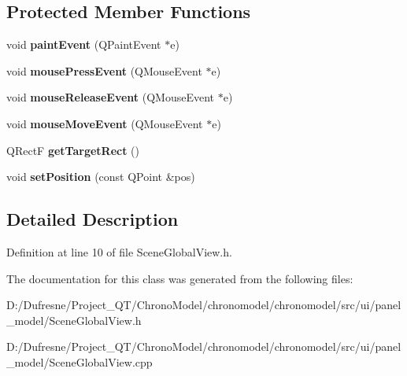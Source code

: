 \subsection*{Protected Member Functions}
\begin{DoxyCompactItemize}
\item 
\hypertarget{class_scene_global_view_ad8dca7d7bc4fbe3737174afe87e99eb5}{void {\bfseries paint\-Event} (Q\-Paint\-Event $\ast$e)}\label{class_scene_global_view_ad8dca7d7bc4fbe3737174afe87e99eb5}

\item 
\hypertarget{class_scene_global_view_acaafabb7a43f832f3e299c7e112d1392}{void {\bfseries mouse\-Press\-Event} (Q\-Mouse\-Event $\ast$e)}\label{class_scene_global_view_acaafabb7a43f832f3e299c7e112d1392}

\item 
\hypertarget{class_scene_global_view_ab20bdc63db23d3e12e7af74cf28ac563}{void {\bfseries mouse\-Release\-Event} (Q\-Mouse\-Event $\ast$e)}\label{class_scene_global_view_ab20bdc63db23d3e12e7af74cf28ac563}

\item 
\hypertarget{class_scene_global_view_adbb2c6777e750896b58f77e6309287e3}{void {\bfseries mouse\-Move\-Event} (Q\-Mouse\-Event $\ast$e)}\label{class_scene_global_view_adbb2c6777e750896b58f77e6309287e3}

\item 
\hypertarget{class_scene_global_view_a8ad64b0ccbadd3e11cb119f106c963a1}{Q\-Rect\-F {\bfseries get\-Target\-Rect} ()}\label{class_scene_global_view_a8ad64b0ccbadd3e11cb119f106c963a1}

\item 
\hypertarget{class_scene_global_view_a7a32dcba2f2f995847e4762bfb8bbc28}{void {\bfseries set\-Position} (const Q\-Point \&pos)}\label{class_scene_global_view_a7a32dcba2f2f995847e4762bfb8bbc28}

\end{DoxyCompactItemize}


\subsection{Detailed Description}


Definition at line 10 of file Scene\-Global\-View.\-h.



The documentation for this class was generated from the following files\-:\begin{DoxyCompactItemize}
\item 
D\-:/\-Dufresne/\-Project\-\_\-\-Q\-T/\-Chrono\-Model/chronomodel/chronomodel/src/ui/panel\-\_\-model/Scene\-Global\-View.\-h\item 
D\-:/\-Dufresne/\-Project\-\_\-\-Q\-T/\-Chrono\-Model/chronomodel/chronomodel/src/ui/panel\-\_\-model/Scene\-Global\-View.\-cpp\end{DoxyCompactItemize}
